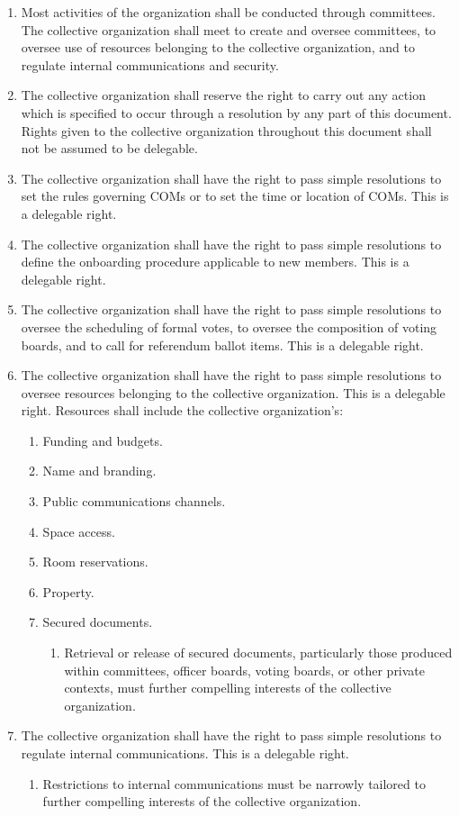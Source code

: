 \documentclass[11pt]{article}
\newcounter{h1}
\newcounter{h2}[h1]
\newcounter{h3}[h2]
\begin{document}
\begin{enumerate}
  \item Most activities of the organization shall be conducted through committees. The collective organization shall meet to create and oversee committees, to oversee use of resources belonging to the collective organization, and to regulate internal communications and security.  
  \item The collective organization shall reserve the right to carry out any action which is specified to occur through a resolution by any part of this document. Rights given to the collective organization throughout this document shall not be assumed to be delegable.  
  \item The collective organization shall have the right to pass simple resolutions to set the rules governing COMs or to set the time or location of COMs. This is a delegable right.  
  \item The collective organization shall have the right to pass simple resolutions to define the onboarding procedure applicable to new members. This is a delegable right.  
  \item The collective organization shall have the right to pass simple resolutions to oversee the scheduling of formal votes, to oversee the composition of voting boards, and to call for referendum ballot items. This is a delegable right.  
  \item The collective organization shall have the right to pass simple resolutions to oversee resources belonging to the collective organization. This is a delegable right. Resources shall include the collective organization's:  
  \begin{enumerate}
    \item Funding and budgets.  
    \item Name and branding.  
    \item Public communications channels.  
    \item Space access.  
    \item Room reservations.  
    \item Property.  
    \item Secured documents.  
    \begin{enumerate}
      \item Retrieval or release of secured documents, particularly those produced within committees, officer boards, voting boards, or other private contexts, must further compelling interests of the collective organization.  
    \end{enumerate}
  \end{enumerate}
  \item The collective organization shall have the right to pass simple resolutions to regulate internal communications. This is a delegable right.  
  \begin{enumerate}
    \item Restrictions to internal communications must be narrowly tailored to further compelling interests of the collective organization.
  \end{enumerate}
\end{enumerate}
\end{document}
